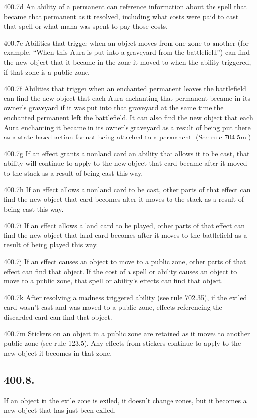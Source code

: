 400.7d An ability of a permanent can reference information about the spell that became that permanent as it resolved, including what costs were paid to cast that spell or what mana was spent to pay those costs.

400.7e Abilities that trigger when an object moves from one zone to another (for example, “When this Aura is put into a graveyard from the battlefield”) can find the new object that it became in the zone it moved to when the ability triggered, if that zone is a public zone.

400.7f Abilities that trigger when an enchanted permanent leaves the battlefield can find the new object that each Aura enchanting that permanent became in its owner’s graveyard if it was put into that graveyard at the same time the enchanted permanent left the battlefield. It can also find the new object that each Aura enchanting it became in its owner’s graveyard as a result of being put there as a state-based action for not being attached to a permanent. (See rule 704.5m.)

400.7g If an effect grants a nonland card an ability that allows it to be cast, that ability will continue to apply to the new object that card became after it moved to the stack as a result of being cast this way.

400.7h If an effect allows a nonland card to be cast, other parts of that effect can find the new object that card becomes after it moves to the stack as a result of being cast this way.

400.7i If an effect allows a land card to be played, other parts of that effect can find the new object that land card becomes after it moves to the battlefield as a result of being played this way.

400.7j If an effect causes an object to move to a public zone, other parts of that effect can find that object. If the cost of a spell or ability causes an object to move to a public zone, that spell or ability’s effects can find that object.

400.7k After resolving a madness triggered ability (see rule 702.35), if the exiled card wasn’t cast and was moved to a public zone, effects referencing the discarded card can find that object.

400.7m Stickers on an object in a public zone are retained as it moves to another public zone (see rule 123.5). Any effects from stickers continue to apply to the new object it becomes in that zone.

\subsection*{400.8.}
If an object in the exile zone is exiled, it doesn’t change zones, but it becomes a new object that has just been exiled.

